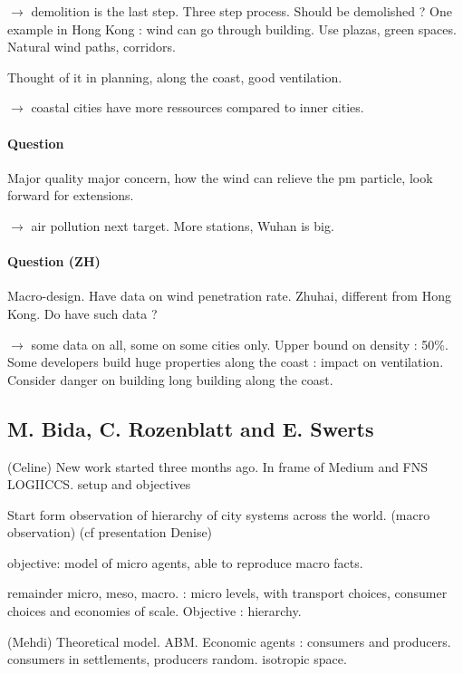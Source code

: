 $\rightarrow$ demolition is the last step. Three step process. Should be demolished ? One example in Hong Kong : wind can go through building. Use plazas, green spaces. Natural wind paths, corridors.

Thought of it in planning, along the coast, good ventilation.

$\rightarrow$ coastal cities have more ressources compared to inner cities.


\paragraph{Question}

Major quality major concern, how the wind can relieve the pm particle, look forward for extensions.

$\rightarrow$ air pollution next target. More stations, Wuhan is big.

\paragraph{Question (ZH)}

Macro-design. Have data on wind penetration rate. Zhuhai, different from Hong Kong. Do have such data ?

$\rightarrow$ some data on all, some on some cities only. Upper bound on density : 50\%. Some developers build huge properties along the coast : impact on ventilation. Consider danger on building long building along the coast.



\subsection*{M. Bida, C. Rozenblatt and E. Swerts}

(Celine) New work started three months ago. In frame of Medium and FNS LOGIICCS. setup and objectives

Start form observation of hierarchy of city systems across the world. (macro observation) (cf presentation Denise)

objective: model of micro agents, able to reproduce macro facts.

remainder micro, meso, macro. : micro levels, with transport choices, consumer choices and economies of scale. Objective : hierarchy.

(Mehdi) Theoretical model. ABM. Economic agents : consumers and producers. consumers in settlements, producers random. isotropic space.

